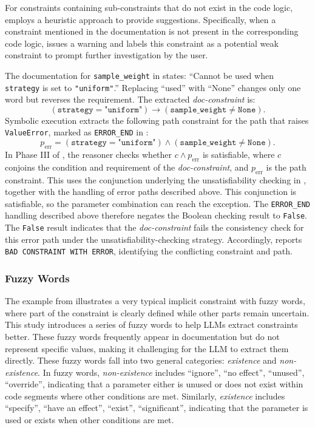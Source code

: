 For constraints containing sub-constraints that do not exist in the code logic, \toolchecker employs a heuristic approach to provide suggestions. Specifically, when a constraint mentioned in the documentation is not present in the corresponding code logic, \toolchecker issues a warning and labels this constraint as a potential weak constraint to prompt further investigation by the user.

The documentation for \texttt{sample\_weight} in  states: ``Cannot be used when \texttt{strategy} is set to \texttt{"uniform"}.'' Replacing ``used'' with ``None'' changes only one word but reverses the requirement. The extracted \emph{doc-constraint} is:
\[
    (\texttt{strategy}=\texttt{"uniform"})\rightarrow(\texttt{sample\_weight}\neq\texttt{None}).
\]
Symbolic execution extracts the following path constraint for the path that raises \texttt{ValueError}, marked as \texttt{ERROR\_END} in :
\[
    p_{\mathrm{err}} = (\texttt{strategy}=\texttt{"uniform"})\land(\texttt{sample\_weight}\neq\texttt{None}).
\]
In Phase III of , the reasoner checks whether $c\land p_{\mathrm{err}}$ is satisfiable, where $c$ conjoins the condition and requirement of the \emph{doc-constraint}, and $p_{\mathrm{err}}$ is the path constraint. This uses the conjunction underlying the unsatisfiability checking in , together with the handling of error paths described above. This conjunction is satisfiable, so the parameter combination can reach the exception. The \texttt{ERROR\_END} handling described above therefore negates the Boolean checking result to \texttt{False}. The \texttt{False} result indicates that the \emph{doc-constraint} fails the consistency check for this error path under the unsatisfiability-checking strategy. Accordingly, \toolchecker reports \texttt{BAD CONSTRAINT WITH ERROR}, identifying the conflicting constraint and path.

\subsubsection{Fuzzy Words}\label{sec:fuzzword-mpchecker}

The example from  illustrates a very typical implicit constraint with fuzzy words, where part of the constraint is clearly defined while other parts remain uncertain. This study introduces a series of fuzzy words to help LLMs extract constraints better. These fuzzy words frequently appear in documentation but do not represent specific values, making it challenging for the LLM to extract them directly. These fuzzy words fall into two general categories: \textit{existence} and \textit{non-existence}. In fuzzy words, \textit{non-existence} includes ``ignore'', ``no effect'', ``unused'', ``override'', indicating that a parameter either is unused or does not exist within code segments where other conditions are met. Similarly, \textit{existence} includes ``specify'', ``have an effect'', ``exist'', ``significant'', indicating that the parameter is used or exists when other conditions are met.

